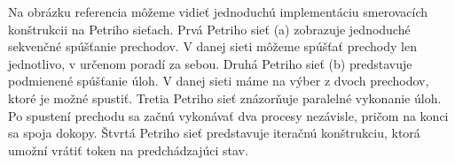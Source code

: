 Na obrázku referencia môžeme vidieť jednoduchú implementáciu smerovacích konštrukcii na Petriho sieťach.
Prvá Petriho sieť (a) zobrazuje jednoduché sekvenčné spúšťanie prechodov. V danej sieti  môžeme spúšťať prechody len jednotlivo, v určenom poradí za sebou.
Druhá Petriho sieť (b) predstavuje podmienené spúšťanie úloh. V danej sieti máme na výber z dvoch prechodov, ktoré je možné spustiť.
Tretia Petriho sieť znázorňuje paralelné vykonanie úloh. Po spustení prechodu sa začnú vykonávať dva procesy nezávisle, pričom na konci sa spoja dokopy.
Štvrtá Petriho sieť predstavuje iteračnú konštrukciu, ktorá umožní vrátiť token na predchádzajúci stav.



